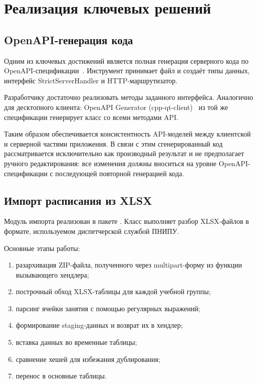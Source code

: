 \chapter{Реализация ключевых решений}
\label{cha:impl}

\section{OpenAPI-генерация кода}

Одним из ключевых достижений является полная генерация серверного кода по OpenAPI-спецификации~\cite{oapi:codegen}. Инструмент  принимает файл  и создаёт типы данных, интерфейс StrictServerHandler и HTTP-маршрутизатор.

Разработчику достаточно реализовать методы заданного интерфейса. Аналогично для десктопного клиента: OpenAPI Generator (cpp-qt-client)~\cite{openapi:generator} из той же спецификации генерирует класс  со всеми методами API.

Таким образом обеспечивается консистентность API-моделей между клиентской и серверной частями приложения. В связи с этим сгенерированный код рассматривается исключительно как производный результат и не предполагает ручного редактирования: все изменения должны вноситься на уровне OpenAPI-спецификации с последующей повторной генерацией кода.

\section{Импорт расписания из XLSX}

Модуль импорта реализован в пакете . Класс  выполняет разбор XLSX-файлов в формате, используемом диспетчерской службой ПНИПУ.

Основные этапы работы:
\begin{enumerate}
\item разархивация ZIP-файла, полученного через multipart-форму из функции вызывающего хендлера;
\item построчный обход XLSX-таблицы для каждой учебной группы;
\item парсинг ячейки занятия с помощью регулярных выражений;
\item формирование staging-данных и возврат их в хендлер;
\item вставка данных во временные таблицы;
\item сравнение хешей для избежания дублирования;
\item перенос в основные таблицы.
\end{enumerate}

